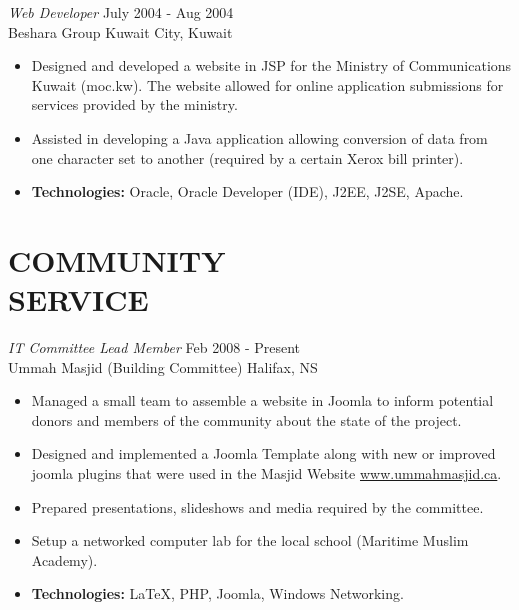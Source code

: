 \documentclass[line,margin]{res}
\begin{document}
\begin{resume}
    {\sl Web Developer} \hfill July 2004 - Aug 2004 \\
    Beshara Group \hfill Kuwait City, Kuwait
    \smallskip
        \begin{itemize}  \itemsep -2pt %
    \item Designed and developed a website in JSP for the Ministry of
        Communications Kuwait (moc.kw). The website allowed for online
        application submissions for services provided by the ministry.
    \item Assisted in developing a Java application allowing conversion of data
        from one character set to another (required by a certain Xerox bill
        printer).
    \item {\bf Technologies:} \hspace{3pt}
        Oracle, Oracle Developer (IDE), J2EE, J2SE, Apache.
        \end{itemize}

\section{COMMUNITY \\ SERVICE}
    {\sl IT Committee Lead Member} \hfill Feb 2008 - Present \\
    Ummah Masjid (Building Committee) \hfill Halifax, NS \smallskip
        \begin{itemize}  \itemsep -2pt %
    \item Managed a small team to assemble a website in Joomla to inform
    potential donors and members of the community about the state of the
    project.
    \item Designed and implemented a Joomla Template along with new or
    improved joomla plugins that were used in the Masjid Website
    \href{http://www.ummahmasjid.ca}{www.ummahmasjid.ca}.
    \item Prepared presentations, slideshows and media
    required by the committee.
    \item Setup a networked computer lab for the local school (Maritime
    Muslim Academy).
    \item {\bf Technologies:} \hspace{1pt}
        LaTeX, PHP, Joomla, Windows Networking.
        \end{itemize}


\end{resume}
\end{document}
